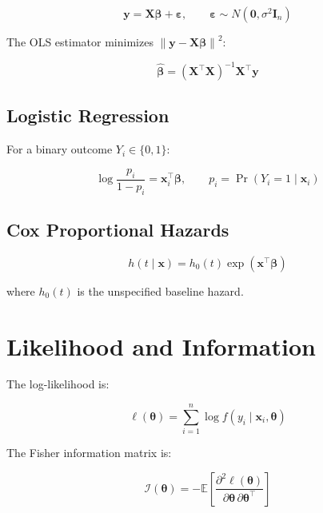 \documentclass[12pt, a4paper]{article}
\newcommand{\E}{\mathbb{E}}
\newcommand{\norm}[1]{\left\lVert #1 \right\rVert}
\newcommand{\given}{\mid}
\theoremstyle{definition}
\theoremstyle{remark}
\begin{document}
\begin{equation}
  \mathbf{y} = \mathbf{X}\boldsymbol{\beta} + \boldsymbol{\varepsilon},
  \qquad
  \boldsymbol{\varepsilon} \sim N(\mathbf{0}, \sigma^2 \mathbf{I}_n)
  \label{eq:lm}
\end{equation}

The OLS estimator minimizes
$\norm{\mathbf{y} - \mathbf{X}\boldsymbol{\beta}}^2$:

\begin{equation}
  \hat{\boldsymbol{\beta}}
    = (\mathbf{X}^\top \mathbf{X})^{-1} \mathbf{X}^\top \mathbf{y}
\end{equation}

\subsection{Logistic Regression}

For a binary outcome $Y_i \in \{0,1\}$:

\begin{equation}
  \log \frac{p_i}{1 - p_i}
    = \mathbf{x}_i^\top \boldsymbol{\beta},
  \qquad
  p_i = \Pr(Y_i = 1 \given \mathbf{x}_i)
\end{equation}

\subsection{Cox Proportional Hazards}

\begin{equation}
  h(t \given \mathbf{x})
    = h_0(t) \exp\!\left(\mathbf{x}^\top \boldsymbol{\beta}\right)
  \label{eq:cox}
\end{equation}

where $h_0(t)$ is the unspecified baseline hazard.

\section{Likelihood and Information}

The log-likelihood is:

\begin{equation}
  \ell(\boldsymbol{\theta})
    = \sum_{i=1}^{n} \log f(y_i \given \mathbf{x}_i, \boldsymbol{\theta})
\end{equation}

The Fisher information matrix is:

\begin{equation}
  \mathcal{I}(\boldsymbol{\theta})
    = -\E\!\left[
        \frac{\partial^2 \ell(\boldsymbol{\theta})}
             {\partial \boldsymbol{\theta} \, \partial \boldsymbol{\theta}^\top}
      \right]
\end{equation}
\end{document}
